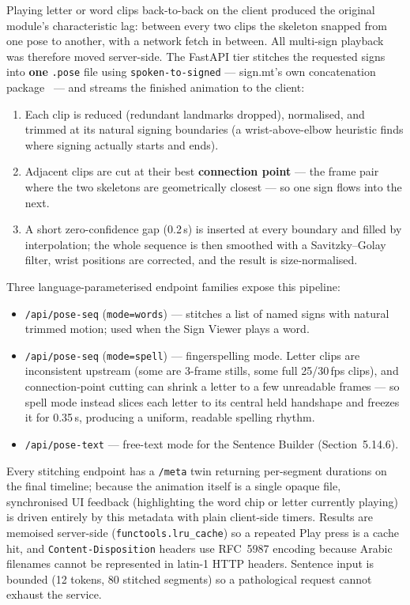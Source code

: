 \noindent Playing letter or word clips back-to-back on the client produced the original module's characteristic lag: between every two clips the skeleton snapped from one pose to another, with a network fetch in between. All multi-sign playback was therefore moved server-side. The FastAPI tier stitches the requested signs into \textbf{one} \texttt{.pose} file using \texttt{spoken-to-signed} --- sign.mt's own concatenation package~\cite{spokentosigned} --- and streams the finished animation to the client:
\begin{enumerate}
\item Each clip is reduced (redundant landmarks dropped), normalised, and trimmed at its natural signing boundaries (a wrist-above-elbow heuristic finds where signing actually starts and ends).
\item Adjacent clips are cut at their best \textbf{connection point} --- the frame pair where the two skeletons are geometrically closest --- so one sign flows into the next.
\item A short zero-confidence gap (0.2\,s) is inserted at every boundary and filled by interpolation; the whole sequence is then smoothed with a Savitzky--Golay filter, wrist positions are corrected, and the result is size-normalised.
\end{enumerate}
\vspace{0.1cm}

\noindent Three language-parameterised endpoint families expose this pipeline:
\begin{itemize}
\item \texttt{/api/pose-seq} (\texttt{mode=words}) --- stitches a list of named signs with natural trimmed motion; used when the Sign Viewer plays a word.
\item \texttt{/api/pose-seq} (\texttt{mode=spell}) --- fingerspelling mode. Letter clips are inconsistent upstream (some are 3-frame stills, some full 25/30\,fps clips), and connection-point cutting can shrink a letter to a few unreadable frames --- so spell mode instead slices each letter to its central held handshape and freezes it for 0.35\,s, producing a uniform, readable spelling rhythm.
\item \texttt{/api/pose-text} --- free-text mode for the Sentence Builder (Section~5.14.6).
\end{itemize}
\vspace{0.1cm}

\noindent Every stitching endpoint has a \texttt{/meta} twin returning per-segment durations on the final timeline; because the animation itself is a single opaque file, synchronised UI feedback (highlighting the word chip or letter currently playing) is driven entirely by this metadata with plain client-side timers. Results are memoised server-side (\texttt{functools.lru\_cache}) so a repeated Play press is a cache hit, and \texttt{Content-Disposition} headers use RFC~5987 encoding because Arabic filenames cannot be represented in latin-1 HTTP headers. Sentence input is bounded (12 tokens, 80 stitched segments) so a pathological request cannot exhaust the service.\par\vspace{0.3cm}

